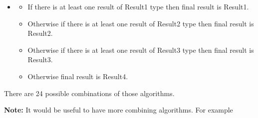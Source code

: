 \documentclass{article}
\newcommand\liststyleWWviiiNumxxi{%
\renewcommand\labelitemi{[F0B7?]}
\renewcommand\labelitemii{o}
\renewcommand\labelitemiii{[F0A7?]}
\renewcommand\labelitemiv{[F0B7?]}
}
\begin{document}
\liststyleWWviiiNumxxi
\begin{itemize}
\item \begin{itemize}
\item {\color{black}
If there is at least one result of Result1 type then final result is
Result1.}
\item {\color{black}
Otherwise if there is at least one result of Result2 type then final
result is Result2.}
\item {\color{black}
Otherwise if there is at least one result of Result3 type then final
result is Result3.}
\item {\color{black}
Otherwise final result is Result4.}
\end{itemize}
\end{itemize}
{\color{black}
There are 24 possible combinations of those algorithms.}

{\upshape\color{black}
\foreignlanguage{english}{\textbf{Note:}}\foreignlanguage{english}{ It
would be useful to have more combining algorithms. For example }}
\end{document}
